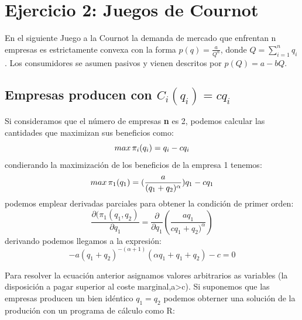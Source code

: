 \documentclass{article}
\begin{document}
\section{Ejercicio 2: Juegos de Cournot}

En el siguiente Juego a la Cournot la demanda de mercado que enfrentan n empresas es estrictamente convexa con la forma
$p(q)=\frac{a}{Q^\alpha}$, donde $Q=\sum_{i=1}^n q_i$. Los consumidores se asumen pasivos y vienen descritos por $p(Q)=a-bQ$.

\subsection{Empresas producen con $C_i(q_i)=cq_i$}
Si consideramos que el n\'umero de empresas \textbf{n} es 2, podemos calcular las cantidades que maximizan sus beneficios como:
 $$max\thinspace \pi_i(q_i)=q_i-cq_i$$
 condierando la maximizaci\'on de los beneficios de la empresa 1 tenemos:
 $$max\thinspace \pi_1(q_1)=(\frac{a}{(q_1+q_2)^\alpha})q_1-cq_1$$
podemos emplear derivadas parciales para obtener la condici\'on de primer orden:
  $$\frac{\partial(\pi_1(q_1,q_2)}{\partial q_1} = \frac{\partial}{\partial q_1} (\frac{aq_1}{cq_1+q_2)^\alpha})$$
  derivando podemos llegamos a la expresi\'on:
  $$-a(q_1+q_2)^{-(\alpha+1)}(\alpha q_1+q_1+q_2)-c=0$$
  
Para resolver la ecuación anterior asignamos valores arbitrarios as variables (la disposici\'on a pagar superior al coste marginal,a>c). Si suponemos que las empresas producen un bien id\'entico $q_1=q_2$ podemos obterner una solución de la produci\'on con un programa de c\'alculo como R:
\end{document}
